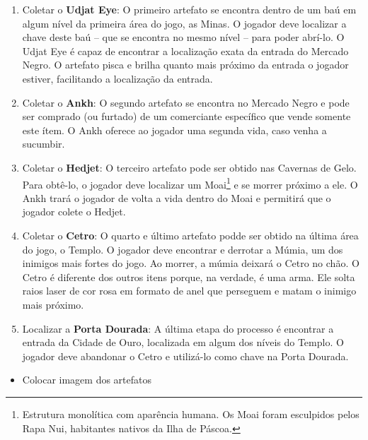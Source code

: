 \begin{enumerate}
	\item Coletar o \textbf{Udjat Eye}: O primeiro artefato se encontra dentro
	de um baú em algum nível da primeira área do jogo, as Minas. O jogador deve
	localizar a chave deste baú -- que se encontra no mesmo nível -- para poder
	abrí-lo. O Udjat Eye é capaz de encontrar a localização exata da entrada do
	Mercado Negro. O artefato pisca e brilha quanto mais próximo da entrada o
	jogador estiver, facilitando a localização da entrada.

	\item Coletar o \textbf{Ankh}: O segundo artefato se encontra no Mercado
	Negro e pode ser comprado (ou furtado) de um comerciante específico que
	vende somente este ítem. O Ankh oferece ao jogador uma segunda vida, caso
	venha a sucumbir.

	\item Coletar o \textbf{Hedjet}: O terceiro artefato pode ser obtido nas
	Cavernas de Gelo. Para obtê-lo, o jogador deve localizar um Moai\footnote{
	Estrutura monolítica com aparência humana. Os Moai foram esculpidos pelos
	Rapa Nui, habitantes nativos da Ilha de Páscoa.} e se morrer próximo a ele.
	O Ankh trará o jogador de volta a vida dentro do Moai e permitirá que o
	jogador colete o Hedjet.

	\item Coletar o \textbf{Cetro}: O quarto e último artefato podde ser obtido
	na última área do jogo, o Templo. O jogador deve encontrar e derrotar a
	Múmia, um dos inimigos mais fortes do jogo. Ao morrer, a múmia deixará o
	Cetro no chão. O Cetro é diferente dos outros itens porque, na verdade, é
	uma arma. Ele solta raios laser de cor rosa em formato de anel que perseguem
	e matam o inimigo mais próximo.

	\item Localizar a \textbf{Porta Dourada}: A última etapa do processo é
	encontrar a entrada da Cidade de Ouro, localizada em algum dos níveis do
	Templo. O jogador deve abandonar o Cetro e utilizá-lo como chave na Porta
	Dourada.
\end{enumerate}

\begin{mdframed}[backgroundcolor=green!20]
\begin{itemize}
    \item
		Colocar imagem dos artefatos
\end{itemize}
\end{mdframed}

